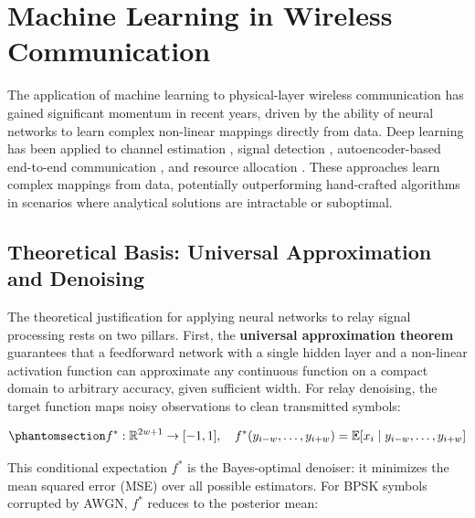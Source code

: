 \section{Machine Learning in Wireless Communication}\label{sec:machine-learning-in-wireless-communication}

The application of machine learning to physical-layer wireless communication has gained significant momentum in recent years, driven by the ability of neural networks to learn complex non-linear mappings directly from data. Deep learning has been applied to channel estimation \cite{YeLiJuang2018OFDMDL}, signal detection \cite{SamuelDiskinWunder2019MIMODetect}, autoencoder-based end-to-end communication \cite{Dorner2018OverTheAirDL}, and resource allocation \cite{Sun2018LearnToOptimize}. These approaches learn complex mappings from data, potentially outperforming hand-crafted algorithms in scenarios where analytical solutions are intractable or suboptimal.

\subsection{Theoretical Basis: Universal Approximation and Denoising}\label{sec:theoretical-basis-universal-approximation-and-denoising}

The theoretical justification for applying neural networks to relay signal processing rests on two pillars. First, the \textbf{universal approximation theorem} \cite{Cybenko1989UAT,Hornik1991UAT,GoodfellowBengioCourville2016DeepLearning} guarantees that a feedforward network with a single hidden layer and a non-linear activation function can approximate any continuous function on a compact domain to arbitrary accuracy, given sufficient width. For relay denoising, the target function maps noisy observations to clean transmitted symbols:

\begin{equation}\protect\phantomsection\label{eq:optimal-denoiser}{f^*: \mathbb{R}^{2w+1} \to [-1, 1], \quad f^*(y_{i-w}, \dots, y_{i+w}) = \mathbb{E}[x_i \mid y_{i-w}, \dots, y_{i+w}]
}\end{equation}

This conditional expectation \(f^*\) is the Bayes-optimal denoiser: it minimizes the mean squared error (MSE) over all possible estimators. For BPSK symbols corrupted by AWGN, \(f^*\) reduces to the posterior mean:

